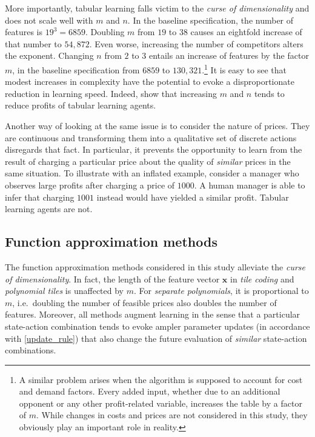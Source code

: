More importantly, tabular learning falls victim to the \emph{curse of dimensionality} and does not scale well with $m$ and $n$. In the baseline specification, the number of features is $19^3 = 6859$. Doubling $m$ from $19$ to $38$ causes an eightfold increase of that number to $54,872$. Even worse, increasing the number of competitors alters the exponent. Changing $n$ from $2$ to $3$ entails an increase of features by the factor $m$, in the baseline specification from $6859$ to $130,321$.\footnote{A similar problem arises when the algorithm is supposed to account for cost and demand factors. Every added input, whether due to an additional opponent or any other profit-related variable, increases the table by a factor of $m$. While changes in costs and prices are not considered in this study, they obviously play an important role in reality.} It is easy to see that modest increases in complexity have the potential to evoke a disproportionate reduction in learning speed. Indeed, \textcite[pp.3288-3292]{calvano_artificial_2020} show that increasing $m$ and $n$ tends to reduce profits of tabular learning agents.

Another way of looking at the same issue is to consider the nature of prices. They are continuous and transforming them into a qualitative set of discrete actions disregards that fact. In particular, it prevents the opportunity to learn from the result of charging a particular price about the quality of \emph{similar} prices in the same situation. To illustrate with an inflated example, consider a manager who observes large profits after charging a price of $1000$. A human manager is able to infer that charging $1001$ instead would have yielded a similar profit. Tabular learning agents are not.

\subsection{Function approximation methods}

The function approximation methods considered in this study alleviate the \emph{curse of dimensionality}. In fact, the length of the feature vector $\boldsymbol{x}$ in \emph{tile coding} and \emph{polynomial tiles} is unaffected by $m$. For \emph{separate polynomials}, it is proportional to $m$, i.e.\ doubling the number of feasible prices also doubles the number of features. Moreover, all methods augment learning in the sense that a particular state-action combination tends to evoke ampler parameter updates (in accordance with \autoref{update_rule}) that also change the future evaluation of \emph{similar} state-action combinations.

